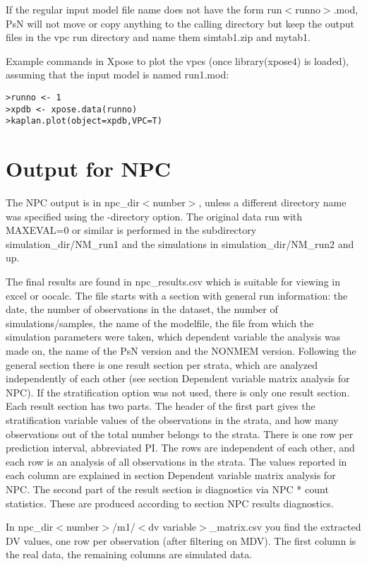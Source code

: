 If the regular input model file name does not have the form run$<$runno$>$.mod, PsN will not move or copy anything to the calling directory but keep the output files in the vpc run directory and name them simtab1.zip and mytab1. 

Example commands in Xpose to plot the vpcs (once library(xpose4) is loaded), assuming that the input model is named run1.mod:
\begin{verbatim}
>runno <- 1
>xpdb <- xpose.data(runno)
>kaplan.plot(object=xpdb,VPC=T)
\end{verbatim}

\section{Output for NPC}
The NPC output is in npc\_dir$<$number$>$, unless a different directory name was specified using the -directory option. The original data run with MAXEVAL=0 or similar is performed in the subdirectory simulation\_dir/NM\_run1 and the simulations in simulation\_dir/NM\_run2 and up. 

The final results are found in npc\_results.csv which is suitable for viewing in excel or oocalc.  The file starts with a section with general run information: the date, the number of observations in the dataset, the number of simulations/samples, the name of the modelfile, the file from which the simulation parameters were taken, which dependent variable the analysis was made on, the name of the PsN version and the NONMEM version. Following the general section there is one result section per strata, which are analyzed independently of each other (see section Dependent variable matrix analysis for NPC). If the stratification option was not used, there is only one result section. Each result section has two parts. The header of the first part gives the stratification variable values of the observations in the strata, and how many observations out of the total number belongs to the strata. There is one row per prediction interval, abbreviated PI. The rows are independent of each other, and each row is an analysis of all observations in the strata. The values reported in each column are explained in section Dependent variable matrix analysis for NPC. The second part of the result section is diagnostics via NPC * count statistics. These are produced according to section NPC results diagnostics.	

In npc\_dir$<$number$>$/m1/$<$dv variable$>$\_matrix.csv you find the extracted DV values, one row per observation (after filtering on MDV). The first column is the real data, the remaining columns are simulated data.

